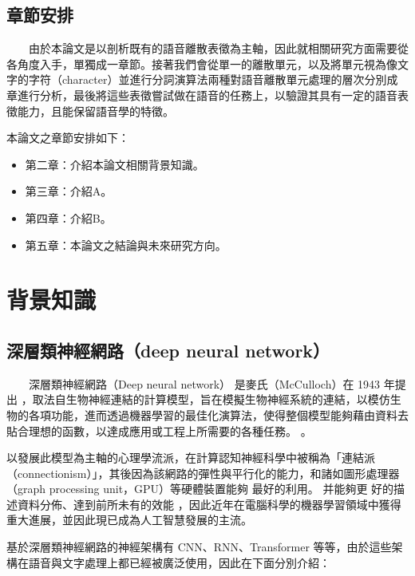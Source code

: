 \section{章節安排}

　　由於本論文是以剖析既有的語音離散表徵為主軸，因此就相關研究方面需要從各角度入手，單獨成一章節。接著我們會從單一的離散單元，以及將單元視為像文字的字符（character）並進行分詞演算法兩種對語音離散單元處理的層次分別成章進行分析，最後將這些表徵嘗試做在語音的任務上，以驗證其具有一定的語音表徵能力，且能保留語音學的特徵。

本論文之章節安排如下：

\begin{itemize}
  \itemsep -2pt %
  \item  第二章：介紹本論文相關背景知識。
  \item  第三章：介紹A。
  \item  第四章：介紹B。
  \item  第五章：本論文之結論與未來研究方向。
\end{itemize}




\chapter{背景知識}
\section{深層類神經網路（deep neural network）}

　　深層類神經網路（Deep neural network） 是麥氏（McCulloch）在 1943 年提出 \cite{mcculloch1943logical}，取法自生物神經連結的計算模型，旨在模擬生物神經系統的連結，以模仿生物的各項功能，進而透過機器學習的最佳化演算法，使得整個模型能夠藉由資料去貼合理想的函數，以達成應用或工程上所需要的各種任務。 。

    以發展此模型為主軸的心理學流派，在計算認知神經科學中被稱為「連結派（connectionism）」，其後因為該網路的彈性與平行化的能力，和諸如圖形處理器（graph processing unit，GPU）等硬體裝置能夠 最好的利用。 
    并能夠更 好的描述資料分佈、達到前所未有的效能 ，因此近年在電腦科學的機器學習領域中獲得重大進展，並因此現已成為人工智慧發展的主流。

    基於深層類神經網路的神經架構有 CNN、RNN、Transformer 等等，由於這些架構在語音與文字處理上都已經被廣泛使用，因此在下面分別介紹：


